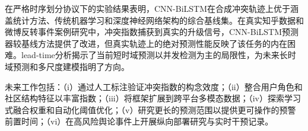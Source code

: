 \documentclass[conference]{IEEEtran}
\begin{document}
在严格时序划分协议下的实验结果表明，CNN-BiLSTM在合成冲突轨迹上优于涵盖统计方法、传统机器学习和深度神经网络架构的综合基线集。在真实知乎数据和微博反转事件案例研究中，冲突指数捕获到真实的升级信号，CNN-BiLSTM预测器较基线方法提供了改进，但真实轨迹上的绝对预测性能反映了该任务的内在困难。lead-time分析揭示了当前短时域预测以并发检测为主的局限性，为未来长时域预测和多尺度建模指明了方向。

未来工作包括：（i）通过人工标注验证冲突指数的构念效度；（ii）整合用户角色和社区结构特征以丰富指数；（iii）将框架扩展到跨平台多模态数据；（iv）探索学习式融合权重和自动化阈值优化；（v）研究更长的预测范围以提供更可操作的预警前置时间；（vi）在高风险舆论事件上开展纵向部署研究与实时干预记录。



\end{document}
